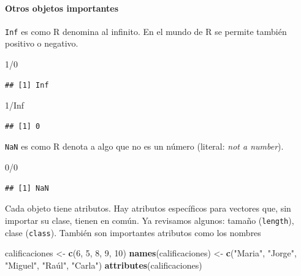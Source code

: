 \documentclass[]{article}
\newenvironment{Shaded}{\begin{snugshade}}{\end{snugshade}}
\newcommand{\KeywordTok}[1]{\textcolor[rgb]{0.13,0.29,0.53}{\textbf{{#1}}}}
\newcommand{\DecValTok}[1]{\textcolor[rgb]{0.00,0.00,0.81}{{#1}}}
\newcommand{\StringTok}[1]{\textcolor[rgb]{0.31,0.60,0.02}{{#1}}}
\newcommand{\OtherTok}[1]{\textcolor[rgb]{0.56,0.35,0.01}{{#1}}}
\newcommand{\NormalTok}[1]{{#1}}
\let\oldparagraph\paragraph
\renewcommand{\paragraph}[1]{\oldparagraph{#1}\mbox{}}
\begin{document}
\paragraph{Otros objetos importantes}\label{otros-objetos-importantes}

\texttt{Inf} es como R denomina al infinito. En el mundo de R se permite
también positivo o negativo.

\begin{Shaded}
\begin{Highlighting}[]
\DecValTok{1}\NormalTok{/}\DecValTok{0}
\end{Highlighting}
\end{Shaded}

\begin{verbatim}
## [1] Inf
\end{verbatim}

\begin{Shaded}
\begin{Highlighting}[]
\DecValTok{1}\NormalTok{/}\OtherTok{Inf}
\end{Highlighting}
\end{Shaded}

\begin{verbatim}
## [1] 0
\end{verbatim}

\texttt{NaN} es como R denota a algo que no es un número (literal:
\emph{not a number}).

\begin{Shaded}
\begin{Highlighting}[]
\DecValTok{0}\NormalTok{/}\DecValTok{0}
\end{Highlighting}
\end{Shaded}

\begin{verbatim}
## [1] NaN
\end{verbatim}

Cada objeto tiene atributos. Hay atributos específicos para vectores
que, sin importar su clase, tienen en común. Ya revisamos algunos:
tamaño (\texttt{length}), clase (\texttt{class}). También son
importantes atributos como los nombres

\begin{Shaded}
\begin{Highlighting}[]
\NormalTok{calificaciones <-}\StringTok{ }\KeywordTok{c}\NormalTok{(}\DecValTok{6}\NormalTok{, }\DecValTok{5}\NormalTok{, }\DecValTok{8}\NormalTok{, }\DecValTok{9}\NormalTok{, }\DecValTok{10}\NormalTok{)}
\KeywordTok{names}\NormalTok{(calificaciones) <-}\StringTok{ }\KeywordTok{c}\NormalTok{(}\StringTok{"Maria"}\NormalTok{, }\StringTok{"Jorge"}\NormalTok{, }\StringTok{"Miguel"}\NormalTok{, }\StringTok{"Raúl"}\NormalTok{, }\StringTok{"Carla"}\NormalTok{)}
\KeywordTok{attributes}\NormalTok{(calificaciones)}
\end{Highlighting}
\end{Shaded}
\end{document}
